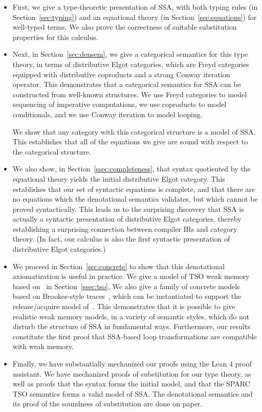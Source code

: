 \documentclass[acmsmall,screen,review]{acmart}
\begin{document}
\begin{itemize}
\item First, we give a type-theoretic presentation of SSA, with both typing rules (in
  Section~\ref{sec:typing}) and an equational theory (in Section~\ref{sec:equations}) for
  well-typed terms. We also prove the correctness of suitable substitution properties for this
  calculus. 
  
\item Next, in Section~\ref{sec:densem}, we give a categorical semantics for this type theory, in
  terms of distributive Elgot categories, which are Freyd categories equipped with distributive
  coproducts and a strong Conway iteration operator. This demonstrates that a categorical semantics
  for SSA can be constructed from well-known structures. We use Freyd categories to model sequencing of
  imperative computations,  we use coproducts to model conditionals, and we use Conway iteration to model
  looping. 

  We show that any category with this categorical structure is a model of SSA. This establishes that all of
  the equations we give are sound with respect to the categorical structure.

\item We also show, in Section~\ref{ssec:completeness}, that syntax quotiented by the equational
  theory yields the initial distributive Elgot category. This establishes that our set of syntactic
  equations is complete, and that there are no equations which the denotational semantics validates,
  but which cannot be proved syntactically. This leads us to the surprising discovery that SSA is actually
  a syntactic presentation of distributive Elgot categories, thereby establishing a surprising connection
  between compiler IRs and category theory. (In fact, our calculus is also the first syntactic presentation
  of distributive Elgot categories.) 

\item We proceed in Section~\ref{sec:concrete} to show that this
  denotational axiomatization is useful in practice. We give a model
  of TSO weak memory based on~\citet{sparky} in
  Section~\ref{ssec:tso}, We also give a family of concrete models
  based on Brookes-style traces~\cite{brookes-full-abstraction-96}, which can be
  instantiated to support the release/acquire model
  of~\citet{release-acquire}. This demonstrates that it is possible to
  give realistic weak memory models, in a variety of semantic styles,
  which do not disturb the structure of SSA in fundamental ways.
  Furthermore, our results constitute the first proof that SSA-based loop transformations
  are compatible with weak memory. 

\item Finally, we have substantially mechanized our proofs using the Lean 4 proof assistant. We have
  mechanized proofs of substitution for our type theory, as well as proofs that the syntax forms the
  initial model, and that the SPARC TSO semantics forms a valid model of SSA. The denotational
  semantics and its proof of the soundness of substitution are done on paper. 
\end{itemize}
\end{document}
